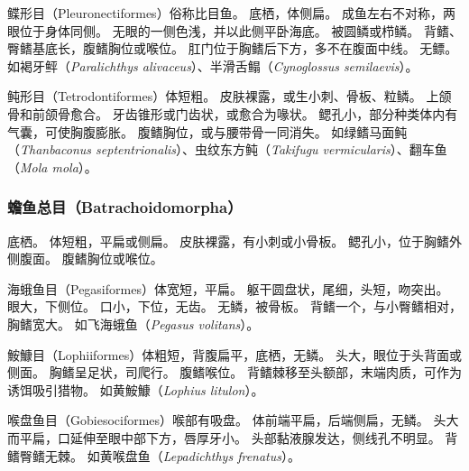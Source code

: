 \documentclass[11pt]{article}
\begin{document}
鲽形目（Pleuronectiformes）俗称比目鱼。
底栖，体侧扁。
成鱼左右不对称，两眼位于身体同侧。
无眼的一侧色浅，并以此侧平卧海底。
被圆鳞或栉鳞。
背鳍、臀鳍基底长，腹鳍胸位或喉位。
肛门位于胸鳍后下方，多不在腹面中线。
无鳔。
如褐牙鲆（\textit{Paralichthys alivaceus}）、半滑舌鳎（\textit{Cynoglossus semilaevis}）。

\newline

鲀形目（Tetrodontiformes）体短粗。
皮肤裸露，或生小刺、骨板、粒鳞。
上颌骨和前颌骨愈合。
牙齿锥形或门齿状，或愈合为喙状。
鳃孔小，部分种类体内有气囊，可使胸腹膨胀。
腹鳍胸位，或与腰带骨一同消失。
如绿鳍马面鲀（\textit{Thanbaconus septentrionalis}）、虫纹东方鲀（\textit{Takifugu vermicularis}）、翻车鱼（\textit{Mola mola}）。

\subsubsection{蟾鱼总目（Batrachoidomorpha）}
底栖。
体短粗，平扁或侧扁。
皮肤裸露，有小刺或小骨板。
鳃孔小，位于胸鳍外侧腹面。
腹鳍胸位或喉位。

\newline

海蛾鱼目（Pegasiformes）体宽短，平扁。
躯干圆盘状，尾细，头短，吻突出。
眼大，下侧位。
口小，下位，无齿。
无鳞，被骨板。
背鳍一个，与小臀鳍相对，胸鳍宽大。
如飞海蛾鱼（\textit{Pegasus volitans}）。

\newline

鮟鱇目（Lophiiformes）体粗短，背腹扁平，底栖，无鳞。
头大，眼位于头背面或侧面。
胸鳍呈足状，司爬行。
腹鳍喉位。
背鳍棘移至头额部，末端肉质，可作为诱饵吸引猎物。
如黄鮟鱇（\textit{Lophius litulon}）。

\newline

喉盘鱼目（Gobiesociformes）喉部有吸盘。
体前端平扁，后端侧扁，无鳞。
头大而平扁，口延伸至眼中部下方，唇厚牙小。
头部黏液腺发达，侧线孔不明显。
背鳍臀鳍无棘。
如黄喉盘鱼（\textit{Lepadichthys frenatus}）。
\end{document}
